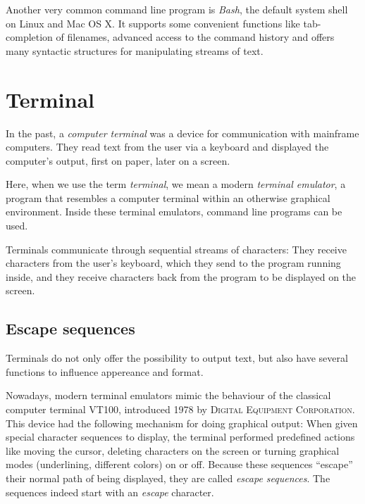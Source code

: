 \documentclass[paper=a4,twoside,abstract=on,cleardoublepage=empty,numbers=noenddot,toc=bib,12pt,appendixprefix=true]{scrreprt}
\begin{document}
\label{sec:cliexamples}

Another very common command line program is \emph{Bash}, the default system shell on Linux and Mac OS X. It supports some convenient functions like tab-completion of filenames, advanced access to the command history and offers many syntactic structures for manipulating streams of text.

\section{Terminal}

In the past, a \emph{computer terminal} was a device for communication with mainframe computers. They read text from the user via a keyboard and displayed the computer's output, first on paper, later on a screen.

Here, when we use the term \emph{terminal}, we mean a modern \emph{terminal emulator}, a program that resembles a computer terminal within an otherwise graphical environment. Inside these terminal emulators, command line programs can be used.

Terminals communicate through sequential streams of characters: They receive characters from the user's keyboard, which they send to the program running inside, and they receive characters back from the program to be displayed on the screen.

\subsection{Escape sequences}

Terminals do not only offer the possibility to output text, but also have several functions to influence appereance and format.

Nowadays, modern terminal emulators mimic the behaviour of the classical computer terminal \textsc{VT100}, introduced 1978 by \textsc{Digital Equipment Corporation}.  This device had the following mechanism for doing graphical output: When given special character sequences to display, the terminal performed predefined actions like moving the cursor, deleting characters on the screen or turning graphical modes (underlining, different colors) on or off. Because these sequences “escape” their normal path of being displayed, they are called \emph{escape sequences}. The sequences indeed start with an \emph{escape} character.
\end{document}

